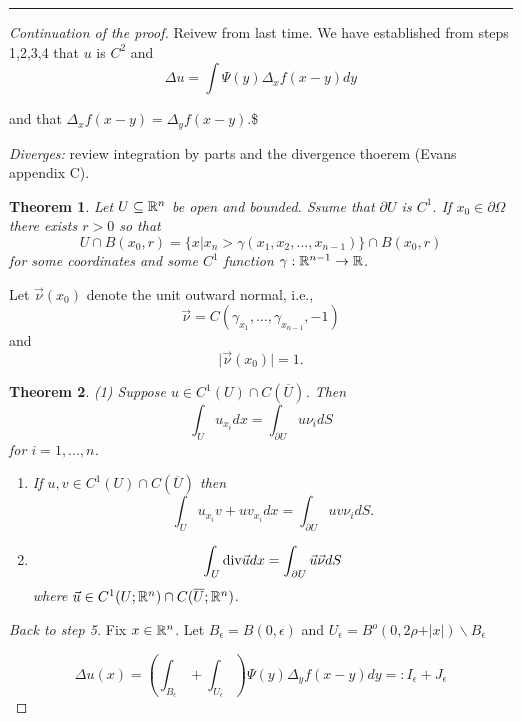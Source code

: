 \documentclass[11pt]{amsart}%
\newtheorem{theorem}{Theorem}
\begin{document}
\begin{center}\rule{0.5\linewidth}{\linethickness}\end{center}
\begin{proof}[Continuation of the proof]
Reivew from last time. We have established from steps 1,2,3,4 that \(u\)
is \(C^2\) and \[\Delta u =\int \Psi(y)\Delta_x f(x-y)dy\]

and that \(\Delta_x f(x-y)= \Delta_y f(x-y).\)\$

\emph{Diverges:} review integration by parts and the divergence thoerem
(Evans appendix C).

\begin{theorem} Let \(U\subseteq \mathbb{R}^n\) be open and bounded. Ssume
that \(\partial U\) is \(C^1\). If \(x_0\in \partial \Omega\) there
exists \(r>0\) so that
\[U\cap B(x_0,r)=\{x\vert x_n >\gamma(x_1, x_2,..., x_{n-1})\} \cap B(x_0,r)\]
for some coordinates and some \(C^1\) function
\(\gamma: \mathbb{R}^{n-1}\to \mathbb{R}\).
\end{theorem}
Let \(\vec{\nu}(x_0)\) denote the unit outward normal, i.e.,
\[\vec{\nu} = C(\gamma_{x_1},...,\gamma_{x_{n-1}},-1)\] and
\[\vert\vec{\nu}(x_0)\vert=1.\]

\begin{theorem} (1) Suppose \(u\in C^1(U)\cap C(\overline{U})\). Then
\[\int_{U} u_{x_i} dx = \int_{\partial U} u\nu_i dS\] for \(i=1,...,n\).

\begin{enumerate}
\def\labelenumi{(\arabic{enumi})}
\setcounter{enumi}{1}
\item
  If \(u,v \in C^1(U)\cap C(\overline{U})\) then
  \[\int_{U} u_{x_i}v+uv_{x_i} dx = \int_{\partial U} uv \nu_i dS.\]
\item
  \[\int_U {\rm div} \vec{u} dx = \int_{\partial U} \vec{u}\vec{\nu}dS\]
  where \(\vec{u}\in C^1(U;\mathbb{R}^n)\cap C(\overline{U};\mathbb{R}^n)\).
\end{enumerate}
\end{theorem}

\emph{Back to step 5.} Fix \(x\in \mathbb{R}^n\). Let
\(B_\epsilon=B(0,\epsilon)\) and
\(U_\epsilon = B^o(0,2\rho+\vert x\vert)\backslash B_\epsilon\)

\[\Delta u(x) = (\int_{B_{\epsilon}}+\int_{U_\epsilon})\Psi(y)\Delta_y f(x-y) dy =: I_\epsilon+J_\epsilon\]


\end{proof}
\end{document}
